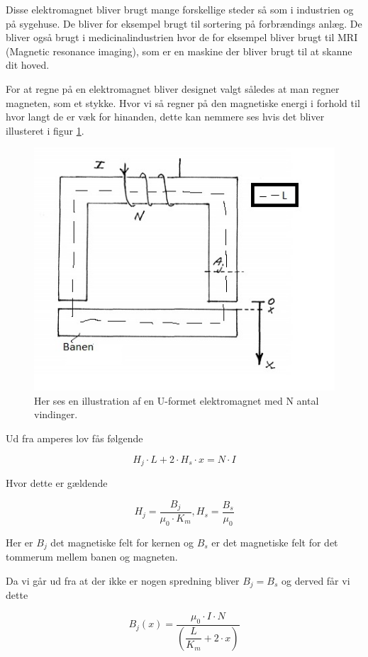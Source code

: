 Disse elektromagnet bliver brugt mange forskellige steder så som i industrien og på sygehuse. De bliver for eksempel brugt til sortering på forbrændings anlæg. De bliver også brugt i medicinalindustrien hvor de for eksempel bliver brugt til MRI (Magnetic resonance imaging), som er en maskine der bliver brugt til at skanne dit hoved.
 
For at regne på en elektromagnet bliver designet valgt således at man regner magneten, som et stykke. Hvor vi så regner på den magnetiske energi i forhold til hvor langt de er væk for hinanden, dette kan nemmere ses hvis det bliver illusteret i figur \ref{fig:elektromagnet}.

\begin{figure}[h]

	\centering
		\includegraphics[scale=0.8]{Billeder/elektromagnet.jpg}
	\caption{Her ses en illustration af en U-formet elektromagnet med N antal vindinger.}
	\label{fig:elektromagnet}
\end{figure}

Ud fra amperes lov fås følgende


$$H_j \cdot L+2 \cdot H_s \cdot x = N \cdot I$$

Hvor dette er gældende

$$H_j = \dfrac{B_j}{\mu_0 \cdot K_m}, H_s = \dfrac{B_s}{\mu_0}$$

Her er $B_j$ det magnetiske felt for kernen og $B_s$ er det magnetiske felt for det tommerum mellem banen og magneten.

Da vi går ud fra at der ikke er nogen spredning bliver $B_j = B_s$ og derved får vi dette


$$B_j(x) = \dfrac{\mu_0 \cdot I \cdot N}{(\dfrac{L}{K_m}+2 \cdot x)}$$


